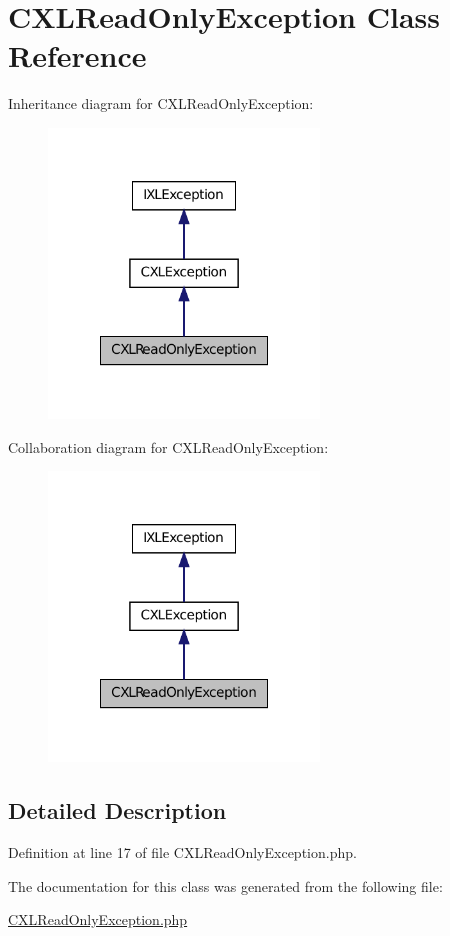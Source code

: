 \hypertarget{classCXLReadOnlyException}{
\section{CXLReadOnlyException Class Reference}
\label{classCXLReadOnlyException}
}


Inheritance diagram for CXLReadOnlyException:\nopagebreak
\begin{figure}[H]
\begin{center}
\leavevmode
\includegraphics[width=204pt]{classCXLReadOnlyException__inherit__graph}
\end{center}
\end{figure}


Collaboration diagram for CXLReadOnlyException:\nopagebreak
\begin{figure}[H]
\begin{center}
\leavevmode
\includegraphics[width=204pt]{classCXLReadOnlyException__coll__graph}
\end{center}
\end{figure}


\subsection{Detailed Description}


Definition at line 17 of file CXLReadOnlyException.php.



The documentation for this class was generated from the following file:\begin{DoxyCompactItemize}
\item 
\hyperlink{CXLReadOnlyException_8php}{CXLReadOnlyException.php}\end{DoxyCompactItemize}
